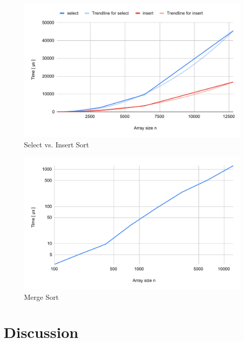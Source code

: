 \documentclass[a4paper,11pt]{article}
\begin{document}
\begin{figure}[h!]
    \centering
    \includegraphics[width=.8\textwidth]{Select and Insert Sort.pdf}
    \caption{Select vs. Insert Sort}
    \label{fig:selectInsert}
\end{figure}

\begin{figure}[h!]
    \centering
    \includegraphics[width=.8\textwidth]{Merge Sort.pdf}
    \caption{Merge Sort}
    \label{fig:merge}
\end{figure}
\section*{Discussion}
\end{document}
